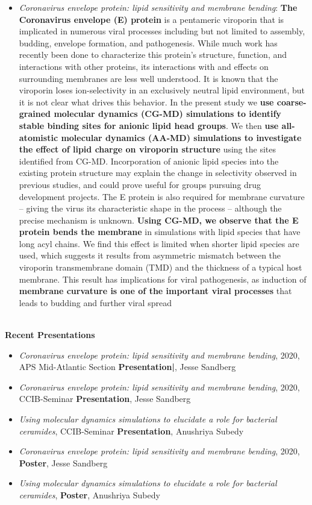 \documentclass[oneside]{report}
\begin{document}
\begin{itemize}
\item \textit{Coronavirus envelope protein: lipid sensitivity and membrane bending}: {\bf The Coronavirus envelope (E) protein} is a pentameric viroporin that is implicated in numerous viral processes including but not limited to assembly, budding, envelope formation, and pathogenesis. While much work has recently been done to characterize this protein’s structure, function, and interactions with other proteins, its interactions with and effects on surrounding membranes are less well understood. It is known that the viroporin loses ion-selectivity in an exclusively neutral lipid environment, but it is not clear what drives this behavior. In the present study we {\bf use coarse-grained molecular dynamics (CG-MD) simulations to identify stable binding sites for anionic lipid head groups}. We then {\bf use all-atomistic molecular dynamics (AA-MD) simulations to investigate the effect of lipid charge on viroporin structure} using the sites identified from CG-MD. Incorporation of anionic lipid species into the existing protein structure may explain the change in selectivity observed in previous studies, and could prove useful for groups pursuing drug development projects. The E protein is also required for membrane curvature – giving the virus its characteristic shape in the process – although the precise mechanism is unknown. {\bf Using CG-MD, we observe that the E protein bends the membrane} in simulations with lipid species that have long acyl chains. We find this effect is limited when shorter lipid species are used, which suggests it results from asymmetric mismatch between the viroporin transmembrane domain (TMD) and the thickness of a typical host membrane. This result has implications for viral pathogenesis, as induction of {\bf membrane curvature is one of the important viral processes} that leads to budding and further viral spread
\end{itemize}\\

{\bf Recent Presentations}
\begin{itemize}
    \item \textit{Coronavirus envelope protein: lipid sensitivity and membrane bending}, 2020, APS Mid-Atlantic Section {\bf Presentation|}, Jesse Sandberg
    \item \textit{Coronavirus envelope protein: lipid sensitivity and membrane bending}, 2020, CCIB-Seminar {\bf Presentation}, Jesse Sandberg
    \item \textit{Using molecular dynamics simulations to elucidate a role for bacterial ceramides}, CCIB-Seminar {\bf Presentation}, Anushriya Subedy
    \item \textit{Coronavirus envelope protein: lipid sensitivity and membrane bending}, 2020, {\bf Poster}, Jesse Sandberg
    \item \textit{Using molecular dynamics simulations to elucidate a role for bacterial ceramides}, {\bf Poster}, Anushriya Subedy
\end{itemize}\\
\end{document}

